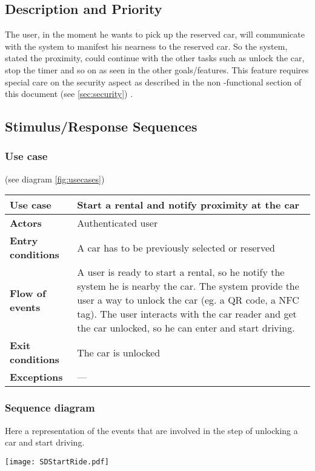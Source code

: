 \documentclass{scrreprt}
\begin{document}
\subsection{Description and Priority}
The user, in the moment he wants to pick up the reserved car, will communicate with the system to manifest his nearness to the reserved car. So the system, stated the proximity, could continue with the other tasks such as unlock the car, stop the timer and so on as seen in the other goals/features.
This feature requires special care on the security aspect as described in the non -functional section of this document (see \vref{sec:security}) .
\subsection{Stimulus/Response Sequences}
\subsubsection{Use case}

(see diagram \vref{fig:usecases})

\begin{center}
\begin{tabularx}{\columnwidth}{>{\bfseries}lX}
\toprule
Use case & Start a rental and notify proximity at the car\\
\midrule
Actors & Authenticated user\\
\midrule
Entry conditions & A car has to be previously selected or reserved\\
\midrule
Flow of events & A user is ready to start a rental, so he notify the system he is nearby the car. The system provide the user a way to unlock the car (eg. a QR code, a NFC tag). The user interacts with the car reader and get the car unlocked, so he can enter and start driving.\\
\midrule
Exit conditions & The car is unlocked\\
\midrule
Exceptions & ---\\
\bottomrule
\end{tabularx}
\end{center}

\subsubsection{Sequence diagram}
Here a representation of the events that are involved in the step of unlocking a car and start driving.
\begin{center}
\texttt{[image: SDStartRide.pdf]}
\end{center}
\end{document}
